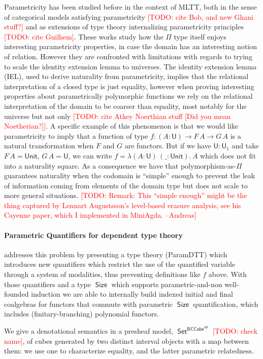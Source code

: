 \documentclass{book}
\newcommand{\TODO}[1]{\textcolor{red}{[TODO: #1]}}
\DeclareMathOperator{\Size}{\mathsf{Size}}
\DeclareMathOperator{\Set}{\mathsf{Set}}
\newcommand{\U}{\mathsf{U}}
\newcommand{\sd}{.\,}
\begin{document}
Parametricity has been studied before in the context of MLTT,
both in the sense of categorical models satisfying parametricity
\TODO{cite Bob, and new Ghani stuff?} and as extensions of type theory
internalizing parametricity principles \TODO{cite Guilhem}.
These works study how the $\Pi$ type itself enjoys interesting
parametricity properties, in case the domain has an interesting notion
of relation. However they are confronted with limitations with regards
to trying to scale the identity extension lemma to universes.
The identity extension lemma (IEL), used to derive naturality from
parametricity, implies that the relational interpretation of a closed
type is just equality, however when proving interesting properties
about parametrically polymorphic functions we rely on the relational
interpretation of the domain to be coarser than equality, most notably
for the universe but not only \TODO{cite Atkey Noerthian stuff [Did
  you mean Noetherian?]}.
A specific example of this phenomenon is that we would like
parametricity to imply that a function of type $f : (A : \U) \to F\,A
\to G\,A$ is a natural transformation when $F$ and $G$ are
functors. But if we have $\U : \U_1$ and take $F\,A = \mathsf{Unit}$,
$G\,A = \U$, we can write $f = \lambda (A : \U)\, (\_ :
\mathsf{Unit})\sd A$ which does not fit into a naturality square.
As a consequence we have that polymorphism-as-$\Pi$ guarantees
naturality when the codomain is ``simple'' enough to prevent the leak
of information coming from elements of the domain type but does not
scale to more general situations.
\TODO{Remark: This ``simple enough'' might be the thing captured by
  Lennart Augustsson's level-based erasure analysis, see his Cayenne
  paper, which I implemented in MiniAgda. --Andreas}

\paragraph{Parametric Quantifiers for dependent type theory}
addresses this problem by presenting a type theory (ParamDTT) which
introduces new quantifiers which restrict the use of the quantified
variable through a system of modalities, thus preventing definitions
like $f$ above.  With those quantifiers and a type $\Size$ which
supports parametric-and-non well-founded induction we are able to
internally build indexed initial and final coalgebras for functors
that commute with parametric $\Size$ quantification, which includes
(finitary-branching) polynomial functors.

We give a denotational semantics in a presheaf model,
$\Set^{\mathsf{BCCube}^{\mathsf{op}}}$ \TODO{check name}, of cubes generated by
two distinct interval objects with a map between them: we use one to
characterize equality, and the latter parametric relatedness.
\end{document}
